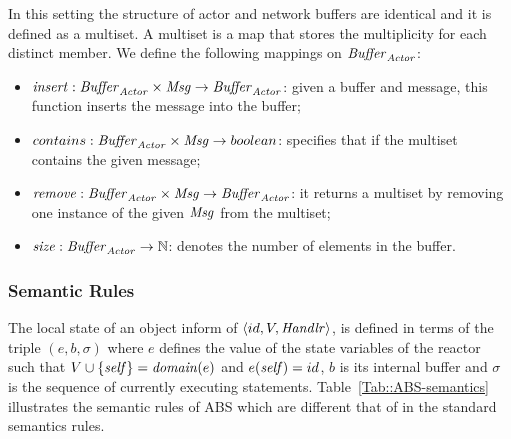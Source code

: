 In this setting the structure of actor and network buffers are identical and it is defined as a multiset. A multiset is a map that stores the multiplicity for each distinct member. %
We define the following mappings on $\mathit{Buffer}_{\it Actor}$:
\begin{itemize} 
\item $\mathit{insert}:\mathit{Buffer}_{\it Actor} \times \mathit{Msg}\rightarrow \mathit{Buffer}_{\it Actor}$: given a buffer and message, this function inserts the message into the buffer;
\item $contains:\mathit{Buffer}_{\it Actor} \times \mathit{Msg} \rightarrow boolean$: specifies that if the multiset contains the given message;
\item $\mathit{remove}:\mathit{Buffer}_{\it Actor} \times \mathit{Msg} \rightarrow \mathit{Buffer}_{\it Actor} $: it returns a multiset by removing one instance of the given $\mathit{Msg}$ from the multiset;
\item $\mathit{size}:\mathit{Buffer}_{\it Actor} \rightarrow \mathbb{N}$: denotes the number of elements in the buffer.
\end{itemize}






\subsubsection{Semantic Rules}
The local state of an object inform of $\langle id, V, \mathit{Handlr}\rangle$, is defined in terms of the triple $(e,b, \sigma)$ where $e$ defines the value of the state variables of the reactor such that $V\cup\{\mathit{self}\}=\mathit{domain}(e)$ and $e(\mathit{self})=id$, $b$ is its internal buffer and $\sigma$ is the sequence of currently executing statements. Table~\ref{Tab::ABS-semantics} illustrates the semantic rules of ABS which are different that of in the standard semantics rules.

